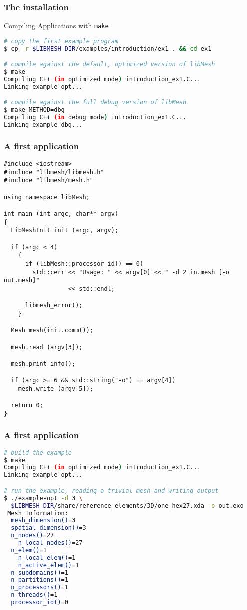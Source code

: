 \begin{frame}
  \frametitle{The \libMesh{} installation}

  \begin{block}{Compiling Applications with \texttt{make}}
    \begin{lstlisting}[language=bash]
# copy the first example program
$ cp -r $LIBMESH_DIR/examples/introduction/ex1 . && cd ex1

# compile against the default, optimized version of libMesh
$ make
Compiling C++ (in optimized mode) introduction_ex1.C...
Linking example-opt...

# compile against the full debug version of libMesh
$ make METHOD=dbg
Compiling C++ (in debug mode) introduction_ex1.C...
Linking example-dbg...
    \end{lstlisting}
  \end{block}
\end{frame}



\begin{frame}
  \frametitle{A first \libMesh{} application}
  \begin{lstlisting}
#include <iostream>
#include "libmesh/libmesh.h"
#include "libmesh/mesh.h"

using namespace libMesh;

int main (int argc, char** argv)
{
  LibMeshInit init (argc, argv);

  if (argc < 4)
    {
      if (libMesh::processor_id() == 0)
        std::cerr << "Usage: " << argv[0] << " -d 2 in.mesh [-o out.mesh]"
                  << std::endl;

      libmesh_error();
    }

  Mesh mesh(init.comm());

  mesh.read (argv[3]);

  mesh.print_info();

  if (argc >= 6 && std::string("-o") == argv[4])
    mesh.write (argv[5]);

  return 0;
}
  \end{lstlisting}
\end{frame}



\begin{frame}
  \frametitle{A first \libMesh{} application}
  \begin{lstlisting}[language=bash]
# build the example
$ make
Compiling C++ (in optimized mode) introduction_ex1.C...
Linking example-opt...

# run the example, reading a trivial mesh and writing output
$ ./example-opt -d 3 \
  $LIBMESH_DIR/share/reference_elements/3D/one_hex27.xda -o out.exo
 Mesh Information:
  mesh_dimension()=3
  spatial_dimension()=3
  n_nodes()=27
    n_local_nodes()=27
  n_elem()=1
    n_local_elem()=1
    n_active_elem()=1
  n_subdomains()=1
  n_partitions()=1
  n_processors()=1
  n_threads()=1
  processor_id()=0
  \end{lstlisting}
\end{frame}

